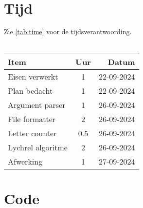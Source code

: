 \documentclass[10pt]{article}
\begin{document}
\section{Tijd}
Zie \ref{tab:time} voor de tijdsverantwoording.
\\ \hfill \\
\begin{tabular}{ l c r }
      \label{tab:time}
      Item & Uur & Datum \\ \hline
      Eisen verwerkt & 1 & 22-09-2024 \\
      Plan bedacht & 1 & 22-09-2024 \\
      Argument parser & 1 & 26-09-2024 \\
      File formatter & 2 & 26-09-2024 \\
      Letter counter & 0.5 & 26-09-2024 \\
      Lychrel algoritme & 2 & 26-09-2024 \\
      Afwerking & 1 & 27-09-2024 \\
    \end{tabular}

\section{Code}\label{sec:code}

\end{document}
